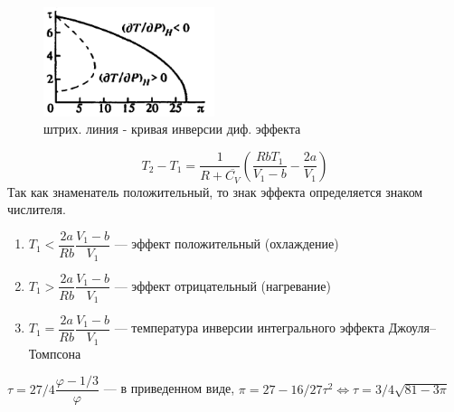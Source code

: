 \begin{figure}
	\includegraphics[width=50mm]{ris22_3.png}
	\caption{штрих. линия - кривая инверсии диф. эффекта}
\end{figure}
$$T_2-T_1=\dfrac{1}{R+\overline{C_V}}\left(\dfrac{RbT_1}{V_1-b}-\dfrac{2a}{V_1}\right)$$
Так как знаменатель положительный, то знак эффекта определяется знаком числителя.
\begin{enumerate}
	\item $T_1<\dfrac{2a}{Rb}\dfrac{V_1-b}{V_1}$ --- эффект положительный (охлаждение)
	\item $T_1>\dfrac{2a}{Rb}\dfrac{V_1-b}{V_1}$ --- эффект отрицательный (нагревание)
	\item $T_1=\dfrac{2a}{Rb}\dfrac{V_1-b}{V_1}$ --- температура инверсии интегрального эффекта Джоуля--Томпсона
\end{enumerate}
$\tau=27/4\dfrac{\varphi-1/3}{\varphi}$ --- в приведенном виде, $\pi=27-16/27\tau^2\Leftrightarrow\tau=3/4\sqrt{81-3\pi}$
